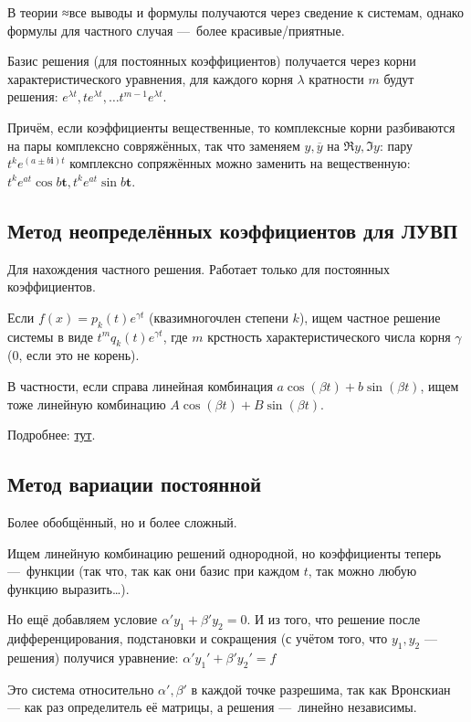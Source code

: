 \documentclass[12pt, a4paper]{article}
\begin{document}
В теории ≈все выводы и формулы получаются через сведение к системам, 
однако формулы для частного случая — более красивые/приятные.


Базис решения (для постоянных коэффициентов) получается через корни характеристического уравнения, 
для каждого корня $\lambda$ кратности $m$ будут решения: $e^{\lambda t}, te^{\lambda t}, … t^{m - 1} e^{\lambda t}$.

Причём, если коэффициенты вещественные, то комплексные корни разбиваются на пары комплексно совряжённых, 
так что заменяем $y, \overline{y}$ на $\Re y, \Im y$: пару $t^k e^{(a ± b\mathbf{i})t}$ комплексно сопряжённых можно заменить на вещественную:
$t^k e^{at} \cos b\mathbf{t}, t^k e^{at} \sin b\mathbf{t}$.


\subsection{Метод неопределённых коэффициентов для ЛУВП}

Для нахождения частного решения. Работает только для постоянных коэффициентов.

Если $f(x) = p_k(t) e^{\gamma t}$ (квазимногочлен степени $k$),
ищем частное решение системы в виде $t^m q_k(t) e^{\gamma t}$, где $m$ крстность характеристического числа корня $\gamma$ ($0$, если это не корень).

В частности, если справа линейная комбинация $a \cos(βt)+b \sin(βt)$, ищем тоже линейную комбинацию $A \cos(βt)+ B \sin(βt)$.

Подробнее: \href{https://tutorial.math.lamar.edu/Classes/DE/UndeterminedCoefficients.aspx}{тут}.

\subsection{Метод вариации постоянной}

Более обобщённый, но и более сложный.

Ищем линейную комбинацию решений однородной, но коэффициенты теперь — функции (так что, так как они базис при каждом $t$, так можно любую функцию выразить…).

Но ещё добавляем условие $\alpha' y_1 + \beta' y_2 = 0$.
И из того, что решение после дифференцирования, подстановки и сокращения (с учётом того, что $y_1, y_2$ — решения) 
получися уравнение: $\alpha' y_1' + \beta' y_2' = f$

Это система относительно $\alpha', \beta'$ в каждой точке разрешима, так как Вронскиан — как раз определитель её матрицы, а решения — линейно независимы.
\end{document}
